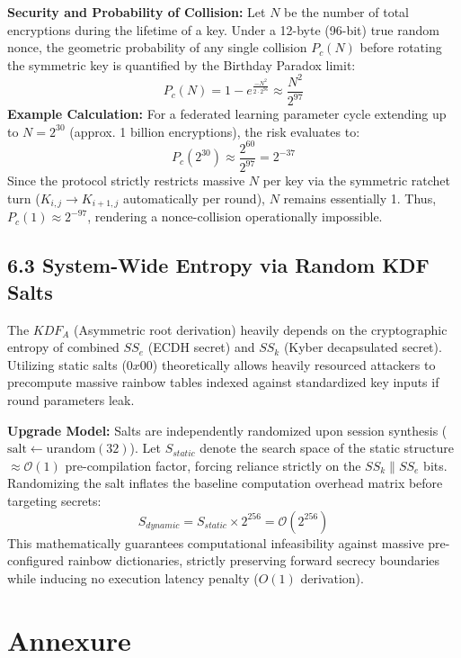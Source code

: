 \documentclass[12pt]{article}
\begin{document}
\textbf{Security and Probability of Collision:}
Let $N$ be the number of total encryptions during the lifetime of a key. Under a 12-byte (96-bit) true random nonce, the geometric probability of any single collision $P_c(N)$ before rotating the symmetric key is quantified by the Birthday Paradox limit:
\[
P_c(N) = 1 - e^{\frac{-N^2}{2 \cdot 2^{96}}} \approx \frac{N^2}{2^{97}}
\]
\textbf{Example Calculation:}
For a federated learning parameter cycle extending up to $N = 2^{30}$ (approx. 1 billion encryptions), the risk evaluates to:
\[
P_c(2^{30}) \approx \frac{2^{60}}{2^{97}} = 2^{-37}
\]
Since the protocol strictly restricts massive $N$ per key via the symmetric ratchet turn ($K_{i,j} \to K_{i+1,j}$ automatically per round), $N$ remains essentially 1. Thus, $P_c(1) \approx 2^{-97}$, rendering a nonce-collision operationally impossible.

\subsection*{6.3 System-Wide Entropy via Random KDF Salts}

The $KDF_A$ (Asymmetric root derivation) heavily depends on the cryptographic entropy of combined $SS_e$ (ECDH secret) and $SS_k$ (Kyber decapsulated secret). Utilizing static salts ($0x00$) theoretically allows heavily resourced attackers to precompute massive rainbow tables indexed against standardized key inputs if round parameters leak.

\textbf{Upgrade Model:}
Salts are independently randomized upon session synthesis ($\text{salt} \leftarrow \text{urandom}(32)$). Let $S_{static}$ denote the search space of the static structure $\approx \mathcal{O}(1)$ pre-compilation factor, forcing reliance strictly on the $SS_k \parallel SS_e$ bits. Randomizing the salt inflates the baseline computation overhead matrix before targeting secrets:
\[
S_{dynamic} = S_{static} \times 2^{256} = \mathcal{O}(2^{256})
\]
This mathematically guarantees computational infeasibility against massive pre-configured rainbow dictionaries, strictly preserving forward secrecy boundaries while inducing no execution latency penalty ($O(1)$ derivation).

\newpage

\section*{Annexure}
\end{document}
